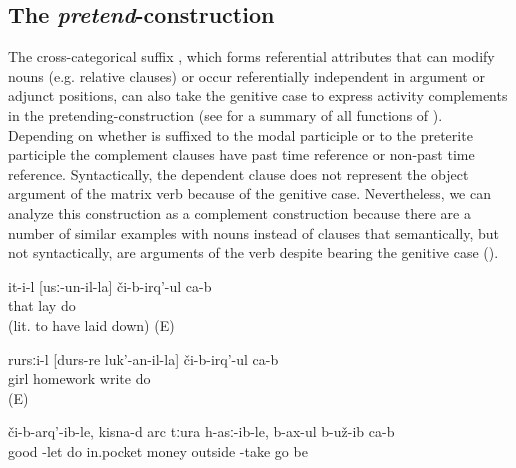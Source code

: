 
\subsection{The \textit{pretend}-construction}
\label{ssec:PretendConstruction}
The cross-categorical suffix , which forms referential attributes that can modify nouns (e.g. relative clauses) or occur referentially independent in argument or adjunct positions, can also take the genitive case to express activity complements in the pretending-construction  (see  for a summary of all functions of ). Depending on whether  is suffixed to the modal participle  or to the preterite participle  the complement clauses have past time reference or non-past time reference. Syntactically, the dependent clause does not represent the object argument of the matrix verb  because of the genitive case. Nevertheless, we can analyze this construction as a complement construction because there are a number of similar examples with nouns instead of clauses that semantically, but not syntactically, are arguments of the verb  despite bearing the genitive case ().
%
\begin{exe}

	\ex	\label{ex:‎‎‎He pretends to sleep (lit. to have laid down)}
	\gll	it-i-l	[usː-un-il-la]	či-b-irq'-ul	ca-b\\
		that	lay	do	\\
	\glt	{} (lit. to have laid down) (E)
	
	\ex	\label{ex:‎‎‎The girl pretends to make the homework}
	\gll	rursːi-l	[durs-re	luk'-an-il-la]	či-b-irq'-ul	ca-b\\
		girl	homework	write	do	\\
	\glt	{} (E)


	\ex	\label{ex:‎‎‎Apparently they pretended to make him to put him (to bed) well, took the money that was in his pocket and left}
		či-b-arq'-ib-le,	kisna-d	arc	tːura	h-asː-ib-le, b-ax-ul	b-už-ib	ca-b\\
		good	-let	do		in.pocket	money	outside	-take	\tsc{hpl-}go	be		\\
	\glt	{}
\end{exe}

